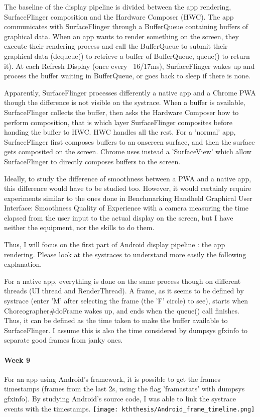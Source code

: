 \documentclass{kththesis}
\begin{document}
The baseline of the display pipeline is divided between the app rendering, SurfaceFlinger composition and the Hardware Composer (HWC). The app communicates with SurfaceFlinger through a BufferQueue containing buffers of graphical data. When an app wants to render something on the screen, they execute their rendering process and call the BufferQueue to submit their graphical data (dequeue() to retrieve a buffer of BufferQueue, queue() to return it). At each Refresh Display (once every ~16/17ms), SurfaceFlinger wakes up and process the buffer waiting in BufferQueue, or goes back to sleep if there is none. 

Apparently, SurfaceFlinger processes differently a native app and a Chrome PWA though the difference is not visible on the systrace. When a buffer is available, SurfaceFlinger collects the buffer, then asks the Hardware Composer how to perform composition, that is which layer SurfaceFlinger composites before handing the buffer to HWC. HWC handles all the rest. For a 'normal' app, SurfaceFlinger first composes buffers to an onscreen surface, and then the surface gets composited on the screen. Chrome uses instead a 'SurfaceView' which allow SurfaceFlinger to directly composes buffers to the screen.

Ideally, to study the difference of smoothness between a PWA and a native app, this difference would have to be studied too. However, it would certainly require experiments similar to the ones done in Benchmarking Handheld Graphical User Interface: Smoothness Quality of Experience    with a camera measuring the time elapsed from the user input to the actual display on the screen, but I have neither the equipment, nor the skills to do them. 

Thus, I will focus on the first part of Android display pipeline : the app rendering. Please look at the systraces to understand more easily the following explanation.

For a native app, everything is done on the same process though on different threads (UI thread and RenderThread). A frame, as it seems to be defined by systrace (enter 'M' after selecting the frame (the 'F' circle) to see), starts when Choreographer{\#}doFrame wakes up, and ends when the queue() call finishes. Thus, it can be defined as the time taken to make the buffer available to SurfaceFlinger. I assume this is also the time considered by dumpsys gfxinfo to separate good frames from janky ones.

\paragraph{Week 9}
For an app using Android's framework, it is possible to get the frames timestamps (frames from the last 2s, using the flag 'framastats' with dumpsys gfxinfo). By studying Android's source code, I was able to link the systrace events with the timestamps.
\newline
\texttt{[image: kththesis/Android\_frame\_timeline.png]}
            
\end{document}
